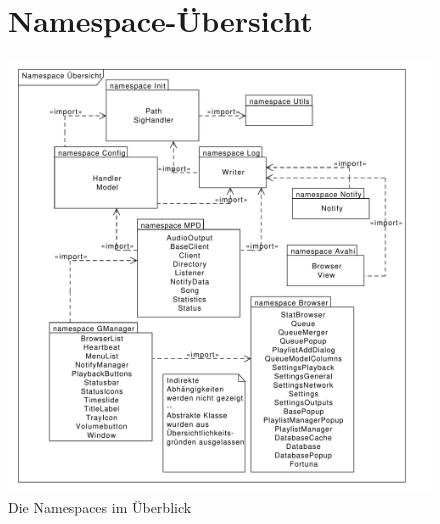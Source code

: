 \begin{figure}
\section{Namespace-Übersicht}
    \centering
    \includegraphics[scale=0.50]{./gfx/class/package}
    \caption{Die Namespaces im Überblick}
    \label{dd_namespaces}
\end{figure}

